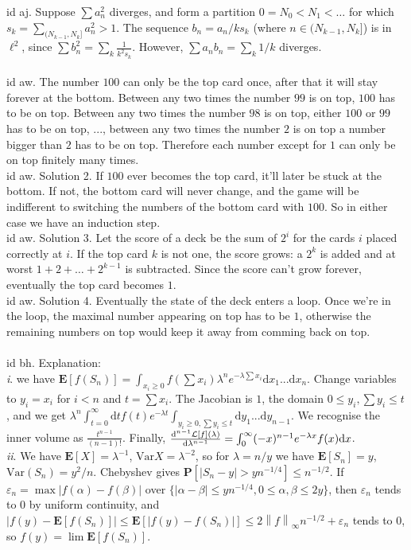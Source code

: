 \documentclass[oneside]{book}
\newcommand{\eps}{\varepsilon}
\renewcommand{\P}{\mathbf{P}}
\newcommand{\E}{\mathbf{E}}
\newcommand{\set}[1]{\{ #1\}}
\newcommand{\inv}{^{-1}}
\newcommand{\abs}[1]{\left\lvert #1\right\rvert}
\newcommand{\norm}[1]{\left\lVert #1\right\rVert}
\renewcommand{\d}{\mathrm{d}}
\newcommand{\var}{\mathrm{Var}}
\renewcommand{\i}{{\it i}. }
\newcommand{\ii}{{\it ii}. }
\begin{document}
id aj. Suppose $\sum a_n^2$ diverges, and form a partition $0=N_0<N_1<\dots$ for which $s_k=\sum_{(N_{k-1},N_k]}a_n^2 > 1$. The sequence $b_n=a_n/ks_k$ (where $n\in (N_{k-1},N_k]$) is in $\ell^2$, since $\sum b_n^2=\sum_k \frac{1}{k^2s_k}$. However, $\sum a_nb_n=\sum_k 1/k$ diverges.    \\\\


id aw. The number $100$ can only be the top card once, after that it will stay forever at the bottom. Between any two times the number $99$ is on top, $100$ has to be on top. Between any two times the number $98$ is on top, either $100$ or $99$ has to be on top, ..., between any two times the number $2$ is on top a number bigger than $2$ has to be on top. Therefore each number except for $1$ can only be on top finitely many times.  \\

id aw. Solution 2. If $100$ ever becomes the top card, it'll later be stuck at the bottom. If not, the bottom card will never change, and the game will be indifferent to switching the numbers of the bottom card with $100$. So in either case we have an induction step. \\

id aw. Solution 3. Let the score of a deck be the sum of $2^i$ for the cards $i$ placed correctly at $i$. If the top card $k$ is not one, the score grows: a $2^k$ is added and at worst $1+2+\dots+2^{k-1}$ is subtracted. Since the score can't grow forever, eventually the top card becomes $1$.    \\

id aw. Solution 4. Eventually the state of the deck enters a loop. Once we're in the loop, the maximal number appearing on top has to be $1$, otherwise the remaining numbers on top would keep it away from comming back on top.   \\\\

id bh. Explanation: \\
\i we have $\E[f(S_n)]=\int_{x_i\ge0}f(\sum x_i)\lambda^n e^{-\lambda\sum x_i}\d x_1...\d x_n$. Change variables to $y_i=x_i$ for $i<n$ and $t=\sum x_i$. The Jacobian is $1$, the domain $0\le y_i, \sum y_i\le t$, and we get $\lambda^n\int_{t=0}^{\infty}\d t f(t)e^{-\lambda t} \int_{y_i\ge 0, \sum y_i\le t}\d y_1...\d y_{n-1} $. We recognise the inner volume as $\frac{t^{n-1}}{(n-1)!}$. Finally, $\frac{\d^{n-1} \LL[f](\lambda)}{\d \lambda^{n-1}}=\int_0^{\infty} (-x)^{n-1} e^{-\lambda x}f(x)\d x$.  \\
\ii We have $\E[X]=\lambda\inv$, $\var X=\lambda^{-2}$, so for $\lambda=n/y$ we have $\E[S_n]=y$, $\var(S_n)=y^2/n$. Chebyshev gives $\P[\abs{S_n-y}>yn^{-1/4}]\le n^{-1/2}$. If $\eps_n=\displaystyle\max\abs{f(\alpha)-f(\beta)}$ over $\set{\abs{\alpha-\beta}\le yn^{-1/4}, 0\le\alpha,\beta\le 2y}$, then $\eps_n$ tends to $0$ by uniform continuity, and $\abs{f(y)-\E[f(S_n)]}\le\E[\abs{f(y)-f(S_n)}]\le 2\norm{f}_\infty n^{-1/2} + \eps_n$ tends to $0$, so $f(y)=\lim\E[f(S_n)]$.   \\\\
\end{document}
